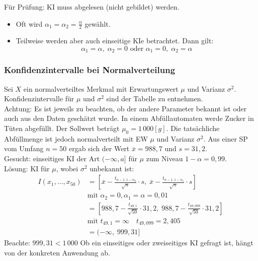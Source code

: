 Für Prüfung: KI muss abgelesen (nicht gebildet) werden.

\begin{itemize}
\item Oft wird $\alpha_1=\alpha_2 = \frac{\alpha}{2}$ gewählt.
\item Teilweise werden aber auch einseitige KIe betrachtet. Dann gilt:
$$\alpha_1 = \alpha, \; \alpha_2 = 0 \text{ oder } \alpha_1 = 0 ,\; \alpha_2 = \alpha$$
\end{itemize}

\subsubsection{Konfidenzintervalle bei Normalverteilung}
Sei $X$ ein normalverteiltes Merkmal mit Erwartungswert $\mu$ und Varianz $\sigma^2$. Konfidenzintervalle für $\mu$ und $\sigma^2$ sind der Tabelle zu entnehmen.\\
Achtung: Es ist jeweils zu beachten, ob der andere Parameter bekannt ist oder auch aus den Daten geschätzt wurde.
In einem Abfüllautomaten werde Zucker in Tüten abgefüllt. Der Sollwert beträgt $\mu_0 = 1\,000\unit{[g]}$. Die tatsächliche Abfüllmenge ist jedoch normalverteilt mit EW $\mu$ und Varianz $\sigma^2$. Aus einer SP vom Umfang $n=50$ ergab sich der Wert $\overline{x}=988,7$ und $s=31,2$.\\
Gesucht: einseitiges KI der Art $(-\infty, a]$ für $\mu$ zum Niveau $1-\alpha = 0,99$.\\
Lösung: KI für $\mu$, wobei $\sigma^2$ unbekannt ist:
\begin{align*}
I(x_1, \ldots, x_{50}) &= \left[ \overline{x}-\frac{t_{n-1,1-\alpha_2}}{\sqrt{n}} \cdot s, \; \overline{x}-\frac{t_{n-1,1-\alpha_1}}{\sqrt{n}} \cdot s \right]\\
& \text{mit }\alpha_2=0, \alpha_1=\alpha=0,01\\
&=\left[988,7 - \frac{t_{49,1}}{\sqrt{50}}\cdot 31,2, \; 988,7 - \frac{t_{49,099}}{\sqrt{50}}\cdot 31,2\right]\\
& \text{mit }t_{49,1} = \infty \quad t_{49,099}=2,405\\
&= (-\infty,\; 999,31]
\end{align*}
Beachte: $999,31 < 1\,000$
 Ob ein einseitiges oder zweiseitiges KI gefragt ist, hängt von der konkreten Anwendung ab.
